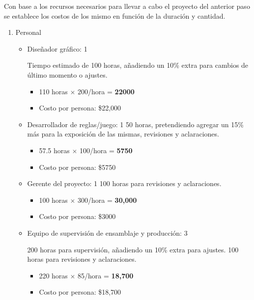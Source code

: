 \documentclass[12pt]{article}
\begin{document}
    Con base a los recursos necesarios para llevar a cabo el proyecto del anterior paso se establece los costos de los mismo en función de la duración y cantidad.
    \begin{enumerate}
	\item Personal

	\begin{itemize}
		\item Diseñador gráfico: 1 

        Tiempo estimado de 100 horas, añadiendo un 10\% extra para cambios de último momento o ajustes.
        \begin{itemize}
            \item 110 horas $\times$ 200/hora = \textbf{22000}
            \item Costo por persona: \$22,000
        \end{itemize}	

     
		\item Desarrollador de reglas/juego: 1
           50 horas, pretendiendo agregar un 15\% más para la exposición de las mismas, revisiones y aclaraciones.
            \begin{itemize}
            \item 57.5 horas $\times$ 100/hora = \textbf{5750}
            \item Costo por persona: \$5750
            \end{itemize}	

		\item Gerente del proyecto: 1
            100 horas para revisiones y aclaraciones.
            \begin{itemize}
            \item 100 horas $\times$ 300/hora = \textbf{30,000}
            \item Costo por persona: \$3000
            \end{itemize}	

		\item Equipo de supervisión de ensamblaje y producción:  3

          200 horas para supervisión, añadiendo un 10\% extra para ajustes.
           100 horas para revisiones y aclaraciones.
            \begin{itemize}
            \item 220 horas $\times$ 85/hora = \textbf{18,700}
            \item Costo por persona: \$18,700
            \end{itemize}	


\end{itemize}
\end{enumerate}
\end{document}
